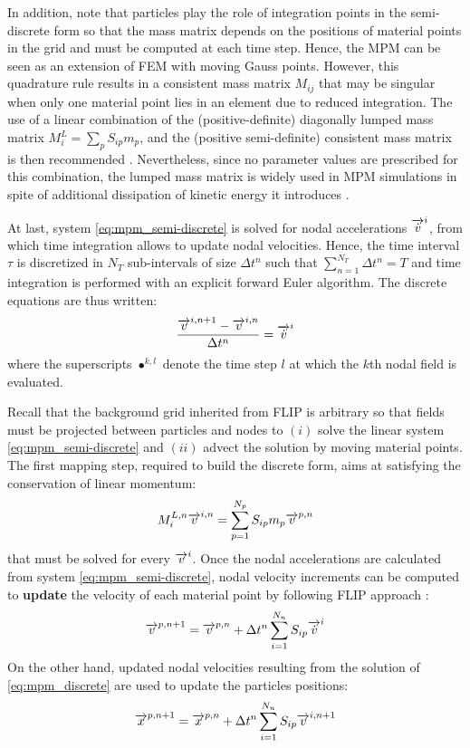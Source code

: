 In addition, note that particles play the role of integration points in the semi-discrete form so that the mass matrix depends on the positions of material points in the grid and must be computed at each time step. Hence, the MPM can be seen as an extension of FEM with moving Gauss points. However, this quadrature rule results in a consistent mass matrix $M_{ij}$ that may be singular when only one material point lies in an element due to reduced integration. The use of a linear combination of the (positive-definite) diagonally lumped mass matrix $M^L_i=\sum_p S_{ip}m_p$, and the (positive semi-definite) consistent mass matrix is then recommended \cite{Love}. Nevertheless, since no parameter values are prescribed for this combination, the lumped mass matrix is widely used in MPM simulations in spite of additional dissipation of kinetic energy it introduces \cite{Mass_Flip}. 

At last, system \eqref{eq:mpm_semi-discrete} is solved for nodal accelerations ${\overrightarrow{\dot{v}}}^i$, from which time integration allows to update nodal velocities. Hence, the time interval $\tau$ is discretized in $N_T$ sub-intervals of size $\Delta t^n$ such that $\sum_{n=1}^{N_T} \Delta t^n = T$ and time integration is performed with an explicit forward Euler algorithm. The discrete equations are thus written:
\begin{equation}
  \label{eq:mpm_discrete}
  \frac{{\overrightarrow{v}}^{i,n+1}-{\overrightarrow{v}}^{i,n}}{\Delta t^n} = {\overrightarrow{\dot{v}}}^i
\end{equation}
where the superscripts $\bullet^{k,l}$ denote the time step $l$ at which the $k$th nodal field is evaluated. 

Recall that the background grid inherited from FLIP is arbitrary so that fields must be projected between particles and nodes to $(i)$ solve the linear system \eqref{eq:mpm_semi-discrete} and $(ii)$ advect the solution by moving material points. The first mapping step, required to build the discrete form, aims at satisfying the conservation of linear momentum:
\begin{equation}
  \label{eq:particles2nodes}
  M^{L,n}_i {\overrightarrow{v}}^{i,n} = \sum_{p=1}^{N_p} S_{ip}m_p {\overrightarrow{v}}^{p,n}
\end{equation}
that must be solved for every ${\overrightarrow{v}}^i$. Once the nodal accelerations are calculated from system \eqref{eq:mpm_semi-discrete}, nodal velocity increments can be computed to \textbf{update} the velocity of each material point by following FLIP approach \cite{PIC_Nishiguchi}:
\begin{equation}
  \label{eq:mp_velocity_update}
  {\overrightarrow{v}}^{p,n+1}= {\overrightarrow{v}}^{p,n}+ \Delta t^n \sum_{i=1}^{N_n} S_{ip}{\overrightarrow{\dot{v}}}^{i}
\end{equation}
On the other hand, updated nodal velocities resulting from the solution of \eqref{eq:mpm_discrete} are used to update the particles positions:
\begin{equation}
  \label{eq:position_update}
  {\overrightarrow{x}}^{p,n+1}={\overrightarrow{x}}^{p,n} + \Delta t^n\sum_{i=1}^{N_n} S_{ip}{\overrightarrow{v}}^{i,n+1} 
\end{equation}

